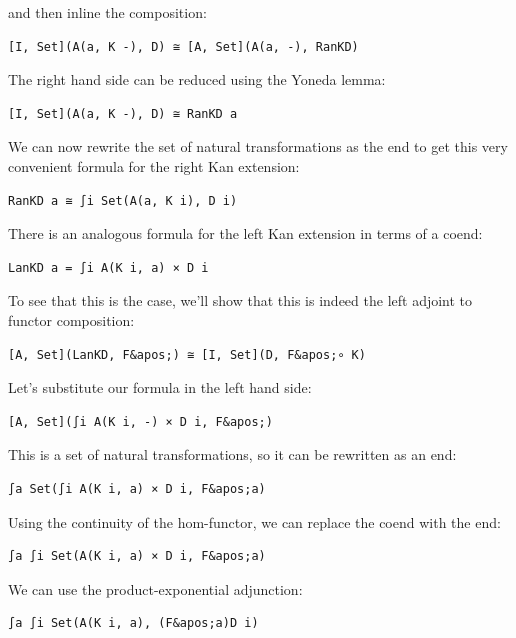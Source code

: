 and then inline the composition:

\begin{verbatim}
[I, Set](A(a, K -), D) ≅ [A, Set](A(a, -), RanKD)
\end{verbatim}

The right hand side can be reduced using the Yoneda lemma:

\begin{verbatim}
[I, Set](A(a, K -), D) ≅ RanKD a
\end{verbatim}

We can now rewrite the set of natural transformations as the end to get
this very convenient formula for the right Kan extension:

\begin{verbatim}
RanKD a ≅ ∫i Set(A(a, K i), D i)
\end{verbatim}

There is an analogous formula for the left Kan extension in terms of a
coend:

\begin{verbatim}
LanKD a = ∫i A(K i, a) × D i
\end{verbatim}

To see that this is the case, we'll show that this is indeed the left
adjoint to functor composition:

\begin{verbatim}
[A, Set](LanKD, F&apos;) ≅ [I, Set](D, F&apos;∘ K)
\end{verbatim}

Let's substitute our formula in the left hand side:

\begin{verbatim}
[A, Set](∫i A(K i, -) × D i, F&apos;)
\end{verbatim}

This is a set of natural transformations, so it can be rewritten as an
end:

\begin{verbatim}
∫a Set(∫i A(K i, a) × D i, F&apos;a)
\end{verbatim}

Using the continuity of the hom-functor, we can replace the coend with
the end:

\begin{verbatim}
∫a ∫i Set(A(K i, a) × D i, F&apos;a)
\end{verbatim}

We can use the product-exponential adjunction:

\begin{verbatim}
∫a ∫i Set(A(K i, a), (F&apos;a)D i)
\end{verbatim}

